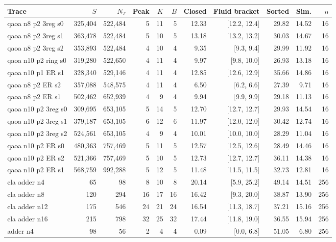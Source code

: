 \begin{table}[htbp]
\centering\scriptsize
\begin{tabular}{lrrrrrrrrrr}
\toprule
Trace & $S$ & $N_T$ & Peak & $K$ & $B$ & Closed & Fluid bracket & Sorted & Sim. & $n$\\\midrule
qaoa n8 p2 3reg s0 & 325,404 & 522,484 & 5 & 11 & 5 & 12.33 & [12.2, 12.4] & 29.82 & 14.52 & 16\\
qaoa n8 p2 3reg s1 & 363,478 & 522,484 & 5 & 10 & 5 & 13.18 & [13.2, 13.2] & 30.03 & 14.67 & 16\\
qaoa n8 p2 3reg s2 & 353,893 & 522,484 & 4 & 10 & 4 & 9.35 & [9.3, 9.4] & 29.99 & 11.92 & 16\\
qaoa n10 p2 ring s0 & 319,280 & 522,650 & 4 & 11 & 4 & 9.97 & [9.8, 10.0] & 26.93 & 13.18 & 16\\
qaoa n10 p1 ER s1 & 328,340 & 529,146 & 4 & 11 & 4 & 12.85 & [12.6, 12.9] & 35.66 & 14.86 & 16\\
qaoa n8 p2 ER s2 & 357,088 & 548,575 & 4 & 11 & 4 & 6.50 & [6.2, 6.6] & 27.39 & 9.71 & 16\\
qaoa n8 p2 ER s1 & 502,462 & 652,939 & 4 & 9 & 4 & 9.94 & [9.9, 9.9] & 29.18 & 11.13 & 16\\
qaoa n10 p2 3reg s0 & 309,695 & 653,105 & 5 & 14 & 5 & 12.70 & [12.7, 12.7] & 29.93 & 14.54 & 16\\
qaoa n10 p2 3reg s1 & 379,187 & 653,105 & 6 & 12 & 6 & 11.97 & [12.0, 12.0] & 30.42 & 12.74 & 16\\
qaoa n10 p2 3reg s2 & 524,561 & 653,105 & 4 & 9 & 4 & 10.01 & [10.0, 10.0] & 28.29 & 11.04 & 16\\
qaoa n10 p2 ER s0 & 480,363 & 757,469 & 5 & 11 & 5 & 12.57 & [12.5, 12.6] & 28.49 & 14.46 & 16\\
qaoa n10 p2 ER s2 & 521,366 & 757,469 & 5 & 10 & 5 & 12.73 & [12.7, 12.7] & 36.11 & 14.38 & 16\\
qaoa n10 p2 ER s1 & 568,759 & 992,288 & 5 & 12 & 5 & 11.48 & [11.5, 11.5] & 32.73 & 12.81 & 16\\
cla adder n4 & 65 & 98 & 8 & 10 & 8 & 20.14 & [5.9, 25.2] & 49.14 & 14.51 & 256\\
cla adder n8 & 120 & 294 & 16 & 17 & 16 & 16.42 & [9.3, 20.0] & 38.87 & 13.90 & 256\\
cla adder n12 & 175 & 546 & 24 & 21 & 24 & 16.54 & [11.3, 18.7] & 37.21 & 15.16 & 256\\
cla adder n16 & 215 & 798 & 32 & 25 & 32 & 17.44 & [11.8, 19.0] & 36.55 & 15.94 & 256\\
adder n4 & 98 & 56 & 2 & 4 & 4 & 0.09 & [0.0, 6.8] & 51.05 & 6.80 & 256\\

\end{tabular}
\end{table}
